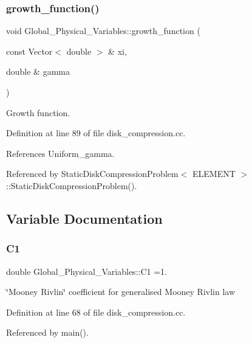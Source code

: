 \subsubsection{\texorpdfstring{growth\+\_\+function()}{growth\_function()}}
{\footnotesize\ttfamily void Global\+\_\+\+Physical\+\_\+\+Variables\+::growth\+\_\+function (\begin{DoxyParamCaption}\item[{const Vector$<$ double $>$ \&}]{xi,  }\item[{double \&}]{gamma }\end{DoxyParamCaption})}



Growth function. 



Definition at line 89 of file disk\+\_\+compression.\+cc.



References Uniform\+\_\+gamma.



Referenced by Static\+Disk\+Compression\+Problem$<$ E\+L\+E\+M\+E\+N\+T $>$\+::\+Static\+Disk\+Compression\+Problem().



\subsection{Variable Documentation}
\mbox{\label{namespaceGlobal__Physical__Variables_a849754fa7155c1a31481674ce4845658}} 
\subsubsection{\texorpdfstring{C1}{C1}}
{\footnotesize\ttfamily double Global\+\_\+\+Physical\+\_\+\+Variables\+::\+C1 =1.}



\char`\"{}\+Mooney Rivlin\char`\"{} coefficient for generalised Mooney Rivlin law 



Definition at line 68 of file disk\+\_\+compression.\+cc.



Referenced by main().

\mbox{\label{namespaceGlobal__Physical__Variables_a2a37fb040c832ee7a086bb13bb02a100}} 
